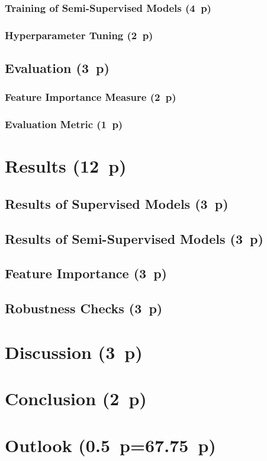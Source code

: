 \subsubsection{Training of Semi-Supervised
  Models (4~p)}\label{training-of-semi-supervised-models}


\subsubsection{Hyperparameter Tuning (2~p)}\label{hyperparameter-tuning}


\subsection{Evaluation (3~p)}\label{evaluation}

\subsubsection{Feature Importance
  Measure (2~p)}\label{feature-importance-measure}

\subsubsection{Evaluation Metric (1~p)}\label{evaluation-metric}

\newpage
\section{Results (12~p)}\label{results}

\subsection{Results of Supervised
  Models (3~p)}\label{results-of-supervised-models}

\subsection{Results of Semi-Supervised
  Models (3~p)}\label{results-of-semi-supervised-models}

\subsection{Feature Importance (3~p)}\label{feature-importance}

\subsection{Robustness Checks (3~p)}\label{robustness-checks}

\newpage
\section{Discussion (3~p)}\label{discussion}

\newpage
\section{Conclusion (2~p)}\label{conclusion}

\newpage
\section{Outlook (0.5~p=67.75~p)}\label{outlook}

